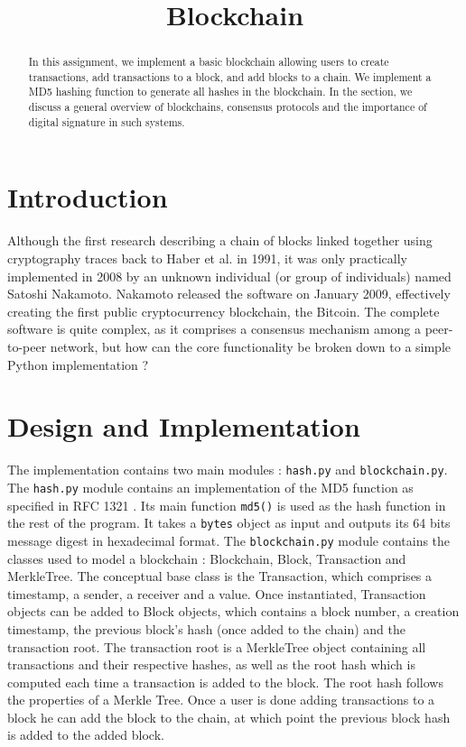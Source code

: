 \documentclass{article}
\title{\textbf{Blockchain}}
\author{}
\date{}
\begin{document}
\maketitle \thispagestyle{fancy}

\begin{abstract}
    In this assignment, we implement a basic blockchain allowing users to create transactions, add transactions to a block, and add blocks to a chain. We implement a MD5 hashing function to generate all hashes in the blockchain. In the  section, we discuss a general overview of blockchains, consensus protocols and the importance of digital signature in such systems.
\end{abstract}

\section{Introduction}

Although the first research describing a chain of blocks linked together using cryptography traces back to Haber et al. in 1991\cite{Haber1991}, it was only practically implemented in 2008 by an unknown individual (or group of individuals) named Satoshi Nakamoto\cite{nakamoto2012bitcoin}. Nakamoto released the software on January 2009, effectively creating the first public cryptocurrency blockchain, the Bitcoin. The complete software is quite complex, as it comprises a consensus mechanism among a peer-to-peer network, but how can the core functionality be broken down to a simple Python implementation ?

\section{Design and Implementation}

The implementation contains two main modules : \verb+hash.py+ and \verb+blockchain.py+. The \verb+hash.py+ module contains an implementation of the MD5 function as specified in RFC 1321 \cite{RFC1321}. Its main function \verb+md5()+ is used as the hash function in the rest of the program. It takes a \verb+bytes+ object as input and outputs its 64 bits message digest in hexadecimal format.
The \verb+blockchain.py+ module contains the classes used to model a blockchain : Blockchain, Block, Transaction and MerkleTree. The conceptual base class is the Transaction, which comprises a timestamp, a sender, a receiver and a value. Once instantiated, Transaction objects can be added to Block objects, which contains a block number, a creation timestamp, the previous block's hash (once added to the chain) and the transaction root. The transaction root is a MerkleTree object containing all transactions and their respective hashes, as well as the root hash which is computed each time a transaction is added to the block. The root hash follows the properties of a Merkle Tree\cite{wiki:merkletree}. Once a user is done adding transactions to a block he can add the block to the chain, at which point the previous block hash is added to the added block.
\end{document}
